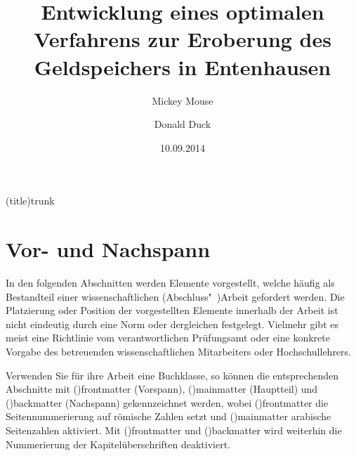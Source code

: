 \documentclass[%
  english,ngerman,%
  cdgeometry=no,DIV=12,%
  cd=false,cdfont=false,cdtitle=true,%
  headings=normal,%
  automark,%
  listof=toc,%
]{tudscrartcl}
\begin{document}
\begin{Code}(title){trunk}
\title{%
  Entwicklung eines optimalen Verfahrens zur Eroberung des
  Geldspeichers in Entenhausen
}
\author{%
  Mickey Mouse%
\and%
  Donald Duck%
}
\date{10.09.2014}
\makecover
\maketitle

\end{Code}



\section{Vor- und Nachspann}

In den folgenden Abschnitten werden Elemente vorgestellt, welche häufig 
als Bestandteil einer wissenschaftlichen (Abschluss"~)Arbeit gefordert werden. 
Die Platzierung oder Position der vorgestellten Elemente innerhalb der Arbeit 
ist nicht eindeutig durch eine Norm oder dergleichen festgelegt. Vielmehr gibt 
es meist eine Richtlinie vom verantwortlichen Prüfungsamt oder eine konkrete 
Vorgabe des betreuenden wissenschaftlichen Mitarbeiters oder Hochschullehrers.

Verwenden Sie für ihre Arbeit eine Buchklasse, so können die entsprechenden 
Abschnitte mit \Macro(){frontmatter} (Vorspann), 
\Macro(){mainmatter} (Hauptteil) und 
\Macro(){backmatter} (Nachspann) gekennzeichnet werden, 
wobei \Macro(){frontmatter} die Seitennummerierung auf 
römische Zahlen setzt und \Macro(){mainmatter} arabische 
Seitenzahlen aktiviert. Mit \Macro(){frontmatter} und 
\Macro(){backmatter} wird weiterhin die Nummerierung der 
Kapitelüberschriften deaktiviert.
\end{document}
